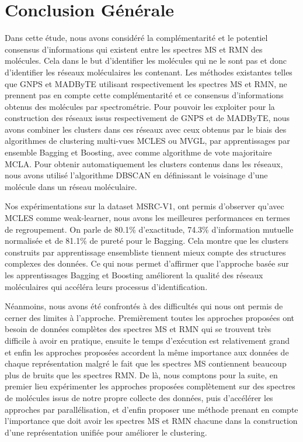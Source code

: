 \chapter{Conclusion Générale}


Dans cette étude, nous avons considéré la complémentarité et le potentiel consensus d'informations qui existent entre les spectres MS et RMN des molécules. Cela dans le but d'identifier les molécules qui ne le sont pas et donc d'identifier les réseaux moléculaires les contenant.
Les méthodes existantes telles que GNPS et MADByTE utilisant respectivement les spectres MS et RMN, ne prennent pas en compte cette complémentarité et ce consensus d'informations obtenus des molécules par spectrométrie.
Pour pouvoir les exploiter pour la construction des réseaux issus respectivement de GNPS et de MADByTE, nous avons combiner les clusters dans ces réseaux avec ceux obtenus par le biais des algorithmes de clustering multi-vues MCLES ou MVGL, par apprentissages par ensemble Bagging et Boosting, avec comme algorithme de vote majoritaire MCLA.
Pour obtenir automatiquement les clusters contenus dans les réseaux, nous avons utilisé l'algorithme DBSCAN en définissant le voisinage d'une molécule dans un réseau moléculaire.

Nos expérimentations sur la dataset MSRC-V1, ont permis d'observer qu'avec MCLES comme weak-learner, nous avons les meilleures performances en termes de regroupement. On parle de 80.1\% d'exactitude, 74.3\% d'information mutuelle normalisée et de 81.1\% de pureté pour le Bagging. Cela montre que les clusters construits par apprentissage ensembliste tiennent mieux compte des structures complexes des données. Ce qui nous permet d’affirmer que l’approche basée sur les apprentissages Bagging et Boosting améliorent la qualité des réseaux moléculaires qui accéléra leurs processus d'identification.

Néanmoins, nous avons été confrontés à des difficultés qui nous ont permis de cerner des limites à l'approche. Premièrement toutes les approches proposées ont besoin de données complètes des spectres MS et RMN qui se trouvent très difficile à avoir en pratique, ensuite le temps d'exécution est relativement grand et enfin les approches proposées accordent la même importance aux données de chaque représentation malgré le fait que les spectres MS contiennent beaucoup plus de bruits que les spectres RMN.
De là, nous comptons pour la suite, en premier lieu expérimenter les approches proposées complètement sur des spectres de molécules issus de notre propre collecte des données, puis d'accélérer les approches par parallélisation, et d'enfin proposer une méthode prenant en compte l'importance que doit avoir les spectres MS et RMN chacune dans la construction d'une représentation unifiée pour améliorer le clustering.

\justify


